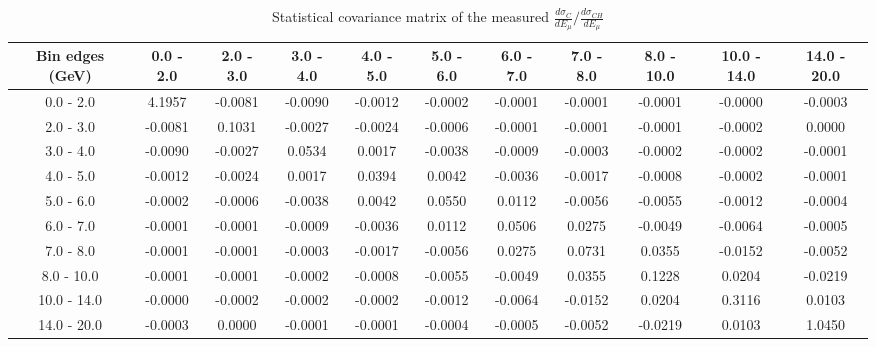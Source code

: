 \documentclass[aps,prl,twocolumn,superscriptaddress,nofootinbib]{revtex4-1}
\begin{document}
\begin{turnpage}
 \begin{table}[h!]
  \centering
  \caption{Statistical covariance matrix of the measured $\frac{d\sigma_{C}}{dE_{\mu}}/\frac{d\sigma_{CH}}{dE_{\mu}}$}
    \begin{tabular}{c||cccccccccc}
      Bin edges (GeV) & 0.0 - 2.0 & 2.0 - 3.0 & 3.0 - 4.0 & 4.0 - 5.0 & 5.0 - 6.0 & 6.0 - 7.0 & 7.0 - 8.0 & 8.0 - 10.0 & 10.0 - 14.0 & 14.0 - 20.0 \\
\hline \hline
        0.0 - 2.0 &  4.1957 & -0.0081 & -0.0090 & -0.0012 & -0.0002 & -0.0001 & -0.0001 & -0.0001 & -0.0000 & -0.0003 \\
        2.0 - 3.0 & -0.0081 &  0.1031 & -0.0027 & -0.0024 & -0.0006 & -0.0001 & -0.0001 & -0.0001 & -0.0002 &  0.0000 \\
        3.0 - 4.0 & -0.0090 & -0.0027 &  0.0534 &  0.0017 & -0.0038 & -0.0009 & -0.0003 & -0.0002 & -0.0002 & -0.0001 \\
        4.0 - 5.0 & -0.0012 & -0.0024 &  0.0017 &  0.0394 &  0.0042 & -0.0036 & -0.0017 & -0.0008 & -0.0002 & -0.0001 \\
        5.0 - 6.0 & -0.0002 & -0.0006 & -0.0038 &  0.0042 &  0.0550 &  0.0112 & -0.0056 & -0.0055 & -0.0012 & -0.0004 \\
        6.0 - 7.0 & -0.0001 & -0.0001 & -0.0009 & -0.0036 &  0.0112 &  0.0506 &  0.0275 & -0.0049 & -0.0064 & -0.0005 \\
        7.0 - 8.0 & -0.0001 & -0.0001 & -0.0003 & -0.0017 & -0.0056 &  0.0275 &  0.0731 &  0.0355 & -0.0152 & -0.0052 \\
       8.0 - 10.0 & -0.0001 & -0.0001 & -0.0002 & -0.0008 & -0.0055 & -0.0049 &  0.0355 &  0.1228 &  0.0204 & -0.0219 \\
      10.0 - 14.0 & -0.0000 & -0.0002 & -0.0002 & -0.0002 & -0.0012 & -0.0064 & -0.0152 &  0.0204 &  0.3116 &  0.0103 \\
      14.0 - 20.0 & -0.0003 &  0.0000 & -0.0001 & -0.0001 & -0.0004 & -0.0005 & -0.0052 & -0.0219 &  0.0103 &  1.0450 \\
    \end{tabular}
  \label{tablecov:C_Statistical_Emu}
  \end{table}
\end{turnpage}
\end{document}
